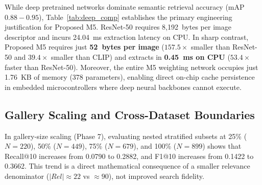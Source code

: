 \documentclass[pdflatex,sn-mathphys-num]{sn-jnl}
\renewenvironment{table}[1][]{%
  \begin{tableorg}[#1]%
  \centering
}{%
  \end{tableorg}%
}
\begin{document}
\begin{table}[!htbp]
\centering
\caption{Comparative evaluation between proposed adaptive handcrafted system and deep baselines on Corel-1K}\label{tab:deep_comp}
\vspace{2mm}
\renewcommand{\arraystretch}{1.15}
\centerline{}
\end{table}

While deep pretrained networks dominate semantic retrieval accuracy (mAP $0.88 - 0.95$), Table~\ref{tab:deep_comp} establishes the primary engineering justification for Proposed M5. ResNet-50 requires 8,192~bytes per image descriptor and incurs 24.04~ms extraction latency on CPU. In sharp contrast, Proposed M5 requires just \textbf{52~bytes per image} ($157.5\times$ smaller than ResNet-50 and $39.4\times$ smaller than CLIP) and extracts in \textbf{0.45~ms on CPU} ($53.4\times$ faster than ResNet-50). Moreover, the entire M5 weighting network occupies just 1.76~KB of memory (378 parameters), enabling direct on-chip cache persistence in embedded microcontrollers where deep neural backbones cannot execute.

\subsection{Gallery Scaling and Cross-Dataset Boundaries}\label{subsec5.5}
In gallery-size scaling (Phase 7), evaluating nested stratified subsets at 25\% ($N=220$), 50\% ($N=449$), 75\% ($N=679$), and 100\% ($N=899$) shows that Recall@10 increases from 0.0790 to 0.2882, and F1@10 increases from 0.1422 to 0.3662. This trend is a direct mathematical consequence of a smaller relevance denominator ($|Rel| \approx 22$ vs $\approx 90$), not improved search fidelity.
\end{document}
